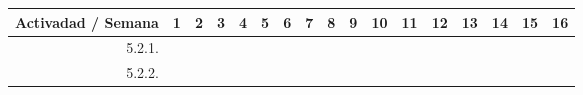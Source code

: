 \documentclass[12pt]{article}
\begin{document}
\begin{table}[H]
{\begin{tabular}{|rllllllllllllllll|}
			\multicolumn{1}{|l|}{\cellcolor[HTML]{D9D9D9}Activadad / Semana}   & \multicolumn{1}{c|}{\cellcolor[HTML]{B6D7A8}1} & \multicolumn{1}{c|}{\cellcolor[HTML]{B6D7A8}2} & \multicolumn{1}{c|}{\cellcolor[HTML]{B6D7A8}3} & \multicolumn{1}{c|}{\cellcolor[HTML]{B6D7A8}4} & \multicolumn{1}{c|}{\cellcolor[HTML]{A4C2F4}5} & \multicolumn{1}{c|}{\cellcolor[HTML]{A4C2F4}6} & \multicolumn{1}{c|}{\cellcolor[HTML]{A4C2F4}7} & \multicolumn{1}{c|}{\cellcolor[HTML]{A4C2F4}8} & \multicolumn{1}{c|}{\cellcolor[HTML]{B4A7D6}9} & \multicolumn{1}{c|}{\cellcolor[HTML]{B4A7D6}10} & \multicolumn{1}{c|}{\cellcolor[HTML]{B4A7D6}11} & \multicolumn{1}{c|}{\cellcolor[HTML]{B4A7D6}12} & \multicolumn{1}{c|}{\cellcolor[HTML]{EA9999}13} & \multicolumn{1}{c|}{\cellcolor[HTML]{EA9999}14} & \multicolumn{1}{c|}{\cellcolor[HTML]{EA9999}15} & \multicolumn{1}{c|}{\cellcolor[HTML]{EA9999}16} \\ \hline
			\multicolumn{1}{|r|}{5.2.1.}                                       & \multicolumn{1}{l|}{}                          & \multicolumn{1}{l|}{}                          & \multicolumn{1}{l|}{}                          & \multicolumn{1}{c|}{\cellcolor[HTML]{B6D7A8}}  & \multicolumn{1}{l|}{}                          & \multicolumn{1}{l|}{}                          & \multicolumn{1}{l|}{}                          & \multicolumn{1}{l|}{}                          & \multicolumn{1}{l|}{}                          & \multicolumn{1}{l|}{}                           & \multicolumn{1}{l|}{}                           & \multicolumn{1}{l|}{}                           & \multicolumn{1}{l|}{}                           & \multicolumn{1}{l|}{}                           & \multicolumn{1}{l|}{}                           &                                                 \\ \hline
			\multicolumn{1}{|r|}{5.2.2.}                                       & \multicolumn{1}{l|}{}                          & \multicolumn{1}{l|}{}                          & \multicolumn{1}{l|}{}                          & \multicolumn{1}{c|}{\cellcolor[HTML]{B6D7A8}}  & \multicolumn{1}{c|}{\cellcolor[HTML]{A4C2F4}}  & \multicolumn{1}{l|}{}                          & \multicolumn{1}{l|}{}                          & \multicolumn{1}{l|}{}                          & \multicolumn{1}{l|}{}                          & \multicolumn{1}{l|}{}                           & \multicolumn{1}{l|}{}                           & \multicolumn{1}{l|}{}                           & \multicolumn{1}{l|}{}                           & \multicolumn{1}{l|}{}                           & \multicolumn{1}{l|}{}                           &                                                 \\ \hline

\end{tabular}}
\end{table}
\end{document}
